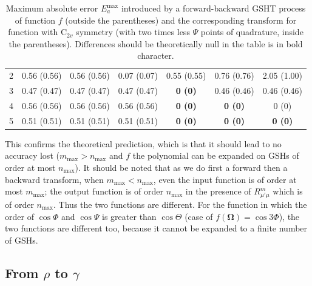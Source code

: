 \begin{table}[H]
\begin{centering}
{\begin{centering}
\begin{tabular*}{1\columnwidth}{@{\extracolsep{\fill}}ccccccc}
\multicolumn{1}{c}{{\footnotesize{}2}} & {\footnotesize{}0.56 (0.56)} & {\footnotesize{}0.56 (0.56)} & {\footnotesize{}0.07 (0.07)} & {\footnotesize{}0.55 (0.55)} & {\footnotesize{}0.76 (0.76)} & {\footnotesize{}2.05 (1.00)}\tabularnewline
{\footnotesize{}3} & {\footnotesize{}0.47 (0.47)} & {\footnotesize{}0.47 (0.47)} & {\footnotesize{}0.47 (0.47)} & \textbf{\footnotesize{}0 (0)} & {\footnotesize{}0.46 (0.46)} & {\footnotesize{}0.46 (0.46)}\tabularnewline
\multicolumn{1}{c}{{\footnotesize{}4}} & {\footnotesize{}0.56 (0.56)} & {\footnotesize{}0.56 (0.56)} & {\footnotesize{}0.56 (0.56)} & \textbf{\footnotesize{}0 (0)} & \textbf{\footnotesize{}0 (0)} & {\footnotesize{}0 (0)}\tabularnewline
\multicolumn{1}{c}{{\footnotesize{}5}} & {\footnotesize{}0.51 (0.51)} & {\footnotesize{}0.51 (0.51)} & {\footnotesize{}0.51 (0.51)} & \textbf{\footnotesize{}0 (0)} & \textbf{\footnotesize{}0 (0)} & \textbf{\footnotesize{}0 (0)}\tabularnewline
\bottomrule
\end{tabular*}
\par\end{centering}
}
\par\end{centering}
\caption[Maximum absolute error $E_{a}^{\mathrm{max}}$ introduced by a forward-backward
GSHT process]{Maximum absolute error $E_{a}^{\mathrm{max}}$ introduced by a forward-backward
GSHT process of function $f$ (outside the parentheses) and the corresponding
transform for function with $\mathrm{C}_{2v}$ symmetry (with two
times less $\Psi$ points of quadrature, inside the parentheses).
Differences should be theoretically null in the table is in bold character.
\label{tab:error-gsh}}
\end{table}

This confirms the theoretical prediction, which is that it should lead to no accuracy
lost ($m_{\max}>n_{\max}$ and $f$ the polynomial can be expanded
on \acs{GSH}s of order at most $n_{\max}$). It should be noted
that as we do first a forward then a backward transform, when $m_{\max}<n_{\max}$,
even the input function is of order at most $m_{\max}$; the output
function is of order $n_{\mathrm{max}}$ in the presence of $R_{\mu'\mu}^{m}$
which is of order $n_{\mathrm{max}}$. Thus the two functions are
different. For the function in which the order of $\cos\Phi$ and $\cos\Psi$
is greater than $\cos\Theta$ (case of $f(\mathbf{\Omega})=\cos3\Phi$),
the two functions are different too, because it cannot be expanded
to a finite number of \acs{GSH}s.

\subsection{From $\rho$ to $\gamma$}

